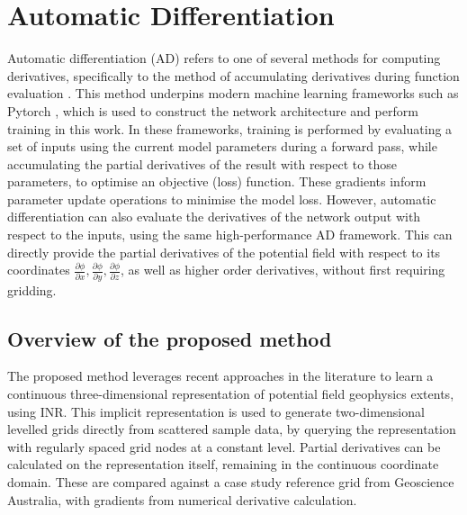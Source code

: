 \section{Automatic Differentiation}
Automatic differentiation (AD) refers to one of several methods for computing derivatives, specifically to the method of accumulating derivatives during function evaluation \parencite{baydinAutomaticDifferentiationMachine2018}.
This method underpins modern machine learning frameworks such as Pytorch \parencite{paszkePyTorchImperativeStyle2019}, which is used to construct the network architecture and perform training in this work.
In these frameworks, training is performed by evaluating a set of inputs using the current model parameters during a forward pass, while accumulating the partial derivatives of the result with respect to those parameters, to optimise an objective (loss) function.
These gradients inform parameter update operations to minimise the model loss.
However, automatic differentiation can also evaluate the derivatives of the network output with respect to the inputs, using the same high-performance AD framework.
This can directly provide the partial derivatives of the potential field with respect to its coordinates \(\frac{\partial\phi{}}{\partial x}, \frac{\partial \phi{}}{\partial y}, \frac{\partial \phi{}}{\partial z}\), as well as higher order derivatives, without first requiring gridding.

\subsection{Overview of the proposed method}
\label{sec:overview}
The proposed method leverages recent approaches in the literature to learn a continuous three-dimensional representation of potential field geophysics extents, using INR\@.
This implicit representation is used to generate two-dimensional levelled grids directly from scattered sample data, by querying the representation with regularly spaced grid nodes at a constant level.
Partial derivatives can be calculated on the representation itself, remaining in the continuous coordinate domain.
These are compared against a case study reference grid from Geoscience Australia, with gradients from numerical derivative calculation.


